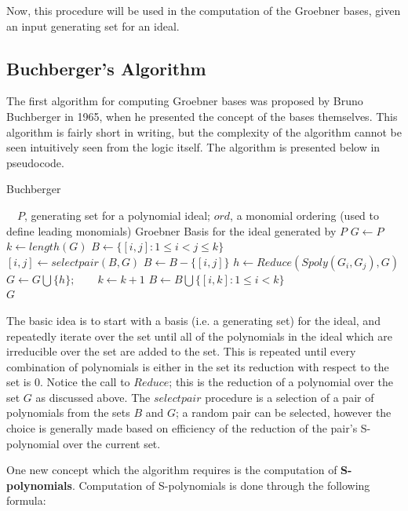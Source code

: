 \documentclass[letterpaper,12pt,titlepage,oneside,final]{book}
\begin{document}
Now, this procedure will be used in the computation of the Groebner bases, given an input generating set for an ideal. 

\subsection{Buchberger's Algorithm}

The first algorithm for computing Groebner bases was proposed by Bruno Buchberger in 1965, when he presented the concept of the bases themselves.  This algorithm is fairly short in writing, but the complexity of the algorithm cannot be seen intuitively seen from the logic itself.  The algorithm is presented below in pseudocode.

\begin{algorithm}[H]
\caption{Buchberger}\label{buchberger}
\begin{algorithmic}[1]
\Input $\quad P$, generating set for a polynomial ideal; $ord$, a monomial ordering (used to define leading monomials)
\Output Groebner Basis for the ideal generated by $P$
\State $G \gets P$
\State $k \gets length( G)$
\State $B \gets \{[i, j] : 1 \leq i < j \leq k\}$\\
  \State $[i, j] \gets selectpair( B, G)$
  \State $B \gets B - \{[i, j]\}$
  \State $h \gets Reduce( Spoly( G_i, G_j), G)$
    \State $G \gets G \bigcup \{h\}; \qquad k \gets k + 1$
    \State $B \gets B \bigcup \{[i, k] : 1 \leq i < k\}$
  \EndIf
\EndWhile\\
\Return $G$
\EndProcedure
\end{algorithmic}
\end{algorithm}  

The basic idea is to start with a basis (i.e. a generating set) for the ideal, and repeatedly iterate over the set until all of the polynomials in the ideal which are irreducible over the set are added to the set.  This is repeated until every combination of polynomials is either in the set its reduction with respect to the set is 0.  Notice the call to ${Reduce}$; this is the reduction of a polynomial over the set ${G}$ as discussed above.  The ${selectpair}$ procedure is a selection of a pair of polynomials from the sets ${B}$ and ${G}$; a random pair can be selected, however the choice is generally made based on efficiency of the reduction of the pair's S-polynomial over the current set.     

One new concept which the algorithm requires is the computation of \textbf{S-polynomials}.  Computation of S-polynomials is done through the following formula: 
\end{document}
